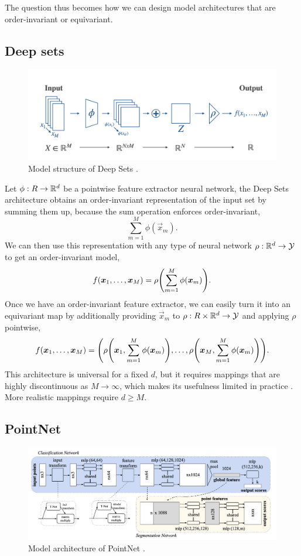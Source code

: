 The question thus becomes how we can design model architectures that are order-invariant or
equivariant.

\subsection{Deep sets}

\begin{figure}[t]
    \includegraphics[width=\textwidth]{figures/deep-sets}
    \caption{Model structure of Deep Sets \citep{zaheer2017deep}.}
    \label{fig:deep-sets}
\end{figure}

Let $\phi: R \to \mathbb{R}^d$ be a pointwise feature extractor neural network, the Deep Sets architecture
\citep{zaheer2017deep} obtains an order-invariant representation of the input set by summing them
up, because the sum operation enforces order-invariant, \[
    \sum_{m=1}^{M} \phi(\vec{x}_m).
\]
We can then use this representation with any type of neural network $\rho: \mathbb{R}^d \to \mathcal{Y}$ to
get an order-invariant model, \[
    f(\vec{x}_1, \ldots, \vec{x}_M) = \rho \lft( \sum_{m=1}^{M} \phi(\vec{x}_m) \rgt).
\]
Once we have an order-invariant feature extractor, we can easily turn it into an equivariant map by
additionally providing $\vec{x}_m$ to $\rho: R \times \mathbb{R}^d \to \mathcal{Y}$ and applying $\rho$
pointwise, \[
    f(\vec{x}_1, \ldots, \vec{x}_M) = \lft( \rho \lft( \vec{x}_1, \sum_{m=1}^{M} \phi(\vec{x}_m) \rgt), \ldots, \rho \lft( \vec{x}_M, \sum_{m=1}^{M} \phi(\vec{x}_m) \rgt) \rgt).
\]
This architecture is universal for a fixed $d$, but it requires mappings that are highly
discontinuous as $M \to \infty$, which makes its usefulness limited in practice
\citep{wagstaff2019limitations}. More realistic mappings require $d \geq M$.

\subsection{PointNet}

\begin{figure}[t]
    \includegraphics[width=\textwidth]{figures/pointnet}
    \caption{Model architecture of PointNet \citep{qi2017pointnet}.}
    \label{fig:pointnet}
\end{figure}

